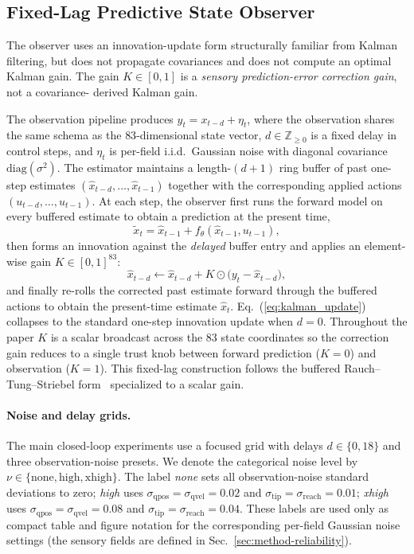 \documentclass[sn-mathphys,NameDate,iicol]{sn-jnl}
\begin{document}
\subsection{Fixed-Lag Predictive State Observer}
\label{sec:method-kalman}
The observer uses an innovation-update form structurally familiar
from Kalman filtering, but does not propagate covariances and does
not compute an optimal Kalman gain. The gain $K\!\in\![0,1]$ is a
\emph{sensory prediction-error correction gain}, not a covariance-%
derived Kalman gain.

The observation pipeline produces $y_t = x_{t-d} + \eta_t$, where the
observation shares the same schema as the $83$-dimensional state vector,
$d\!\in\!\mathbb{Z}_{\geq 0}$ is a fixed delay in control steps, and
$\eta_t$ is per-field i.i.d.\ Gaussian noise with diagonal covariance
$\mathrm{diag}(\sigma^2)$. The estimator maintains
a length-$(d{+}1)$ ring buffer of past one-step estimates
$(\hat x_{t-d}, \dots, \hat x_{t-1})$ together with the corresponding
applied actions $(u_{t-d}, \dots, u_{t-1})$. At each step, the
observer first runs the forward model on every buffered estimate to
obtain a prediction at the present time,
\begin{equation}
\tilde x_t = \hat x_{t-1} + f_\theta(\hat x_{t-1}, u_{t-1}),
\end{equation}
then forms an innovation against the \emph{delayed} buffer entry and
applies an element-wise gain $K\!\in\![0,1]^{83}$:
\begin{equation}
\hat x_{t-d}
\leftarrow
\hat x_{t-d} + K \odot \bigl(y_t - \hat x_{t-d}\bigr),
\label{eq:kalman_update}
\end{equation}
and finally re-rolls the corrected past estimate forward through the
buffered actions to obtain the present-time estimate $\hat x_t$.
Eq.~(\ref{eq:kalman_update}) collapses to the standard one-step
innovation update when $d{=}0$. Throughout the paper $K$ is a scalar
broadcast across the 83 state coordinates so the correction gain reduces to a
single trust knob between forward prediction ($K{=}0$) and
observation ($K{=}1$). This fixed-lag construction follows the
buffered Rauch--Tung--Striebel form~\cite{rauch1965,anderson1979optimal}
specialized to a scalar gain.

\paragraph{Noise and delay grids.}
The main closed-loop experiments use a focused grid with delays
$d\!\in\!\{0,18\}$ and three observation-noise presets. We denote
the categorical noise level by
$\nu\!\in\!\{\mathrm{none},\mathrm{high},\mathrm{xhigh}\}$. The label
\emph{none} sets all observation-noise standard deviations to zero;
\emph{high} uses $\sigma_{\mathrm{qpos}}=\sigma_{\mathrm{qvel}}=0.02$
and $\sigma_{\mathrm{tip}}=\sigma_{\mathrm{reach}}=0.01$; \emph{xhigh}
uses $\sigma_{\mathrm{qpos}}=\sigma_{\mathrm{qvel}}=0.08$ and
$\sigma_{\mathrm{tip}}=\sigma_{\mathrm{reach}}=0.04$. These labels are
used only as compact table and figure notation for the corresponding
per-field Gaussian noise settings (the sensory fields are defined in
Sec.~\ref{sec:method-reliability}).
\end{document}
